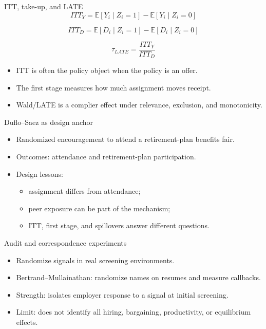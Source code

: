 \documentclass[aspectratio=169,11pt]{beamer}
\newcommand{\E}{\mathbb{E}}
\begin{document}
\begin{frame}{ITT, take-up, and LATE}
\[
ITT_Y = \E[Y_i\mid Z_i=1] - \E[Y_i\mid Z_i=0]
\]

\[
ITT_D = \E[D_i\mid Z_i=1] - \E[D_i\mid Z_i=0]
\]

\[
\tau_{LATE}=\frac{ITT_Y}{ITT_D}
\]

\begin{itemize}
    \item ITT is often the policy object when the policy is an offer.
    \item The first stage measures how much assignment moves receipt.
    \item Wald/LATE is a complier effect under relevance, exclusion, and monotonicity.
\end{itemize}
\end{frame}

\begin{frame}{Duflo--Saez as design anchor}
\begin{itemize}
    \item Randomized encouragement to attend a retirement-plan benefits fair.
    \item Outcomes: attendance and retirement-plan participation.
    \item Design lessons:
    \begin{itemize}
        \item assignment differs from attendance;
        \item peer exposure can be part of the mechanism;
        \item ITT, first stage, and spillovers answer different questions.
    \end{itemize}
\end{itemize}
\end{frame}

\begin{frame}{Audit and correspondence experiments}
\begin{itemize}
    \item Randomize signals in real screening environments.
    \item Bertrand--Mullainathan: randomize names on resumes and measure callbacks.
    \item Strength: isolates employer response to a signal at initial screening.
    \item Limit: does not identify all hiring, bargaining, productivity, or equilibrium effects.
\end{itemize}
\end{frame}
\end{document}
